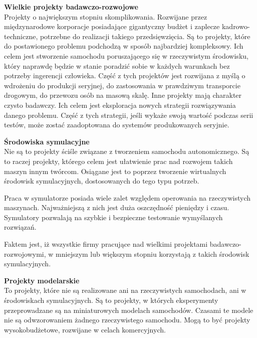 \begin{enumerate*}
\item \textbf{Wielkie projekty badawczo-rozwojowe} \\
Projekty o największym stopniu skomplikowania. Rozwijane przez międzynarodowe korporacje posiadające gigantyczny budżet i zaplecze kadrowo-techniczne, potrzebne do realizacji takiego przedsięwzięcia. 
Są to projekty, które do postawionego problemu podchodzą w sposób najbardziej kompleksowy. Ich celem jest stworzenie samochodu poruszającego się w rzeczywistym środowisku, który naprawdę będzie w stanie poradzić sobie w każdych warunkach bez potrzeby ingerencji człowieka.
Część z tych projektów jest rozwijana z myślą o wdrożeniu do produkcji seryjnej, do zastosowania w prawdziwym transporcie drogowym, do przewozu osób na masową skalę.
Inne projekty mają charakter czysto badawczy. Ich celem jest eksploracja nowych strategii rozwiązywania danego problemu. Część z tych strategii, jeśli wykaże swoją wartość podczas serii testów, może zostać zaadoptowana do systemów produkowanych seryjnie. \\

\item \textbf{Środowiska symulacyjne} \\
Nie są to projekty ściśle związane z tworzeniem samochodu autonomicznego. Są to raczej projekty, którego celem jest ułatwienie prac nad rozwojem takich maszyn innym twórcom. Osiągane jest to poprzez tworzenie wirtualnych środowisk symulacyjnych, dostosowanych do tego typu potrzeb.

Praca w symulatorze posiada wiele zalet względem operowania na rzeczywistych maszynach. Najważniejszą z nich jest duża oszczędność pieniędzy i czasu. Symulatory pozwalają na szybkie i bezpieczne testowanie wymyślanych rozwiązań.

Faktem jest, iż wszystkie firmy pracujące nad wielkimi projektami badawczo-rozwojowymi, w mniejszym lub większym stopniu korzystają z takich środowisk symulacyjnych. \\

\item \textbf{Projekty modelarskie} \\
To projekty, które nie są realizowane ani na rzeczywistych samochodach, ani w środowiskach symulacyjnych. Są to projekty, w których eksperymenty przeprowadzane są na miniaturowych modelach samochodów. Czasami te modele nie są odwzorowaniem żadnego rzeczywistego samochodu. Mogą to być projekty wysokobudżetowe, rozwijane w celach komercyjnych. \\


\end{enumerate*}
